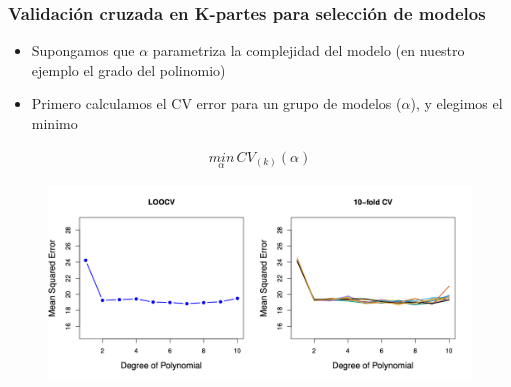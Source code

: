 \documentclass[
  shownotes,
  xcolor={svgnames},
  hyperref={colorlinks,citecolor=DarkBlue,linkcolor=DarkRed,urlcolor=DarkBlue}
  , aspectratio=169]{beamer}
\begin{document}
\begin{frame}[fragile]
\frametitle{Validación cruzada en K-partes para selección de modelos}

\begin{itemize}
  \item Supongamos que $\alpha$ parametriza la complejidad del modelo (en nuestro ejemplo el grado del polinomio)
  \medskip
  \item Primero calculamos el CV error para un grupo de modelos ($\alpha$), y elegimos el minimo

\end{itemize}
\begin{align}
\underset{\alpha}{min} \, CV_{(k)}(\alpha)
\end{align}

        \begin{figure}[H] \centering
            \captionsetup{justification=centering}
              \includegraphics[scale=0.5]{figures/fig54.png}
       \end{figure}

\end{frame}
\end{document}
